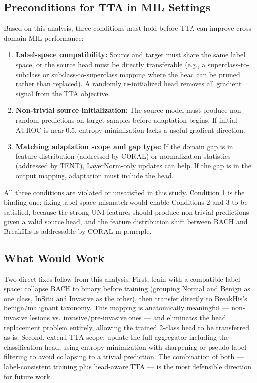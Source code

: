 \documentclass[conference]{IEEEtran}
\begin{document}
\subsection{Preconditions for TTA in MIL Settings}

Based on this analysis, three conditions must hold before TTA can improve cross-domain MIL performance:

\begin{enumerate}
    \item \textbf{Label-space compatibility:} Source and target must share the same label space, or the source head must be directly transferable (e.g., a superclass-to-subclass or subclass-to-superclass mapping where the head can be pruned rather than replaced). A randomly re-initialized head removes all gradient signal from the TTA objective.

    \item \textbf{Non-trivial source initialization:} The source model must produce non-random predictions on target samples before adaptation begins. If initial AUROC is near 0.5, entropy minimization lacks a useful gradient direction.

    \item \textbf{Matching adaptation scope and gap type:} If the domain gap is in feature distribution (addressed by CORAL) or normalization statistics (addressed by TENT), LayerNorm-only updates can help. If the gap is in the output mapping, adaptation must include the head.
\end{enumerate}

All three conditions are violated or unsatisfied in this study. Condition 1 is the binding one: fixing label-space mismatch would enable Conditions 2 and 3 to be satisfied, because the strong UNI features should produce non-trivial predictions given a valid source head, and the feature distribution shift between BACH and BreakHis is addressable by CORAL in principle.

\subsection{What Would Work}

Two direct fixes follow from this analysis. First, train with a compatible label space: collapse BACH to binary before training (grouping Normal and Benign as one class, InSitu and Invasive as the other), then transfer directly to BreakHis's benign/malignant taxonomy. This mapping is anatomically meaningful --- non-invasive lesions vs.\ invasive/pre-invasive ones --- and eliminates the head replacement problem entirely, allowing the trained 2-class head to be transferred as-is. Second, extend TTA scope: update the full aggregator including the classification head, using entropy minimization with sharpening \cite{niu2023towards} or pseudo-label filtering to avoid collapsing to a trivial prediction. The combination of both --- label-consistent training plus head-aware TTA --- is the most defensible direction for future work.
\end{document}
